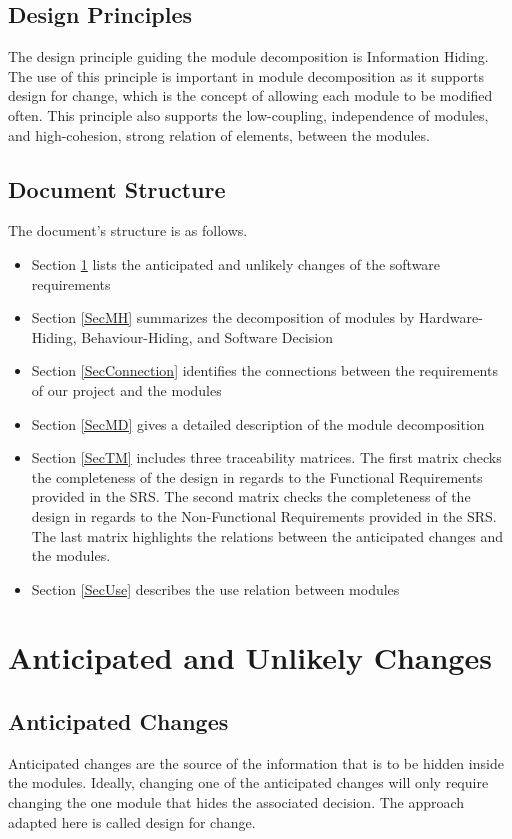 \documentclass[12pt, titlepage]{article}
\begin{document}
\subsection{Design Principles}
The design principle guiding the module decomposition is Information Hiding. The use of this principle is important in module decomposition as it supports design for change, which is the concept of allowing each module to be modified often. This principle also supports the low-coupling, independence of modules, and high-cohesion, strong relation of elements, between the modules.
\subsection{Document Structure}
The document's structure is as follows. 
\begin{itemize}
    \item Section \ref{SecChange} lists the anticipated and unlikely changes of the software requirements 
    \item Section \ref{SecMH} summarizes the decomposition of modules by Hardware-Hiding, Behaviour-Hiding, and Software Decision
    \item Section \ref{SecConnection} identifies the connections between the requirements of our project and the modules
    \item Section \ref{SecMD} gives a detailed description of the module decomposition
    \item Section \ref{SecTM} includes three traceability matrices. The first matrix checks the completeness of the design in regards to the Functional Requirements provided in the SRS. The second matrix checks the completeness of the design in regards to the Non-Functional Requirements provided in the SRS. The last matrix highlights the relations between the anticipated changes and the modules.
    \item Section \ref{SecUse} describes the use relation between modules
\end{itemize}  

\section{Anticipated and Unlikely Changes} \label{SecChange}
\subsection{Anticipated Changes} \label{SecAchange}
Anticipated changes are the source of the information that is to be hidden
inside the modules. Ideally, changing one of the anticipated changes will only
require changing the one module that hides the associated decision. The approach
adapted here is called design for
change.
\end{document}
